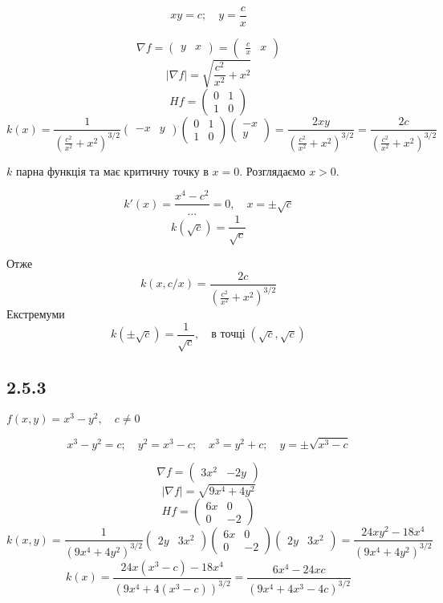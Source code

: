 \documentclass[10pt, a4paper]{article} %
\begin{document}
\[xy=c; \quad y=\frac{c}{x}\]

\[\nabla f = \begin{pmatrix} y & x\end{pmatrix} = \begin{pmatrix} \frac{c}{x} & x\end{pmatrix}\]
\[|\nabla f| = \sqrt{\frac{c^2}{x^2} + x^2}\]
\[Hf = \begin{pmatrix}
    0 & 1 \\ 1 & 0
\end{pmatrix}\]
\[k(x) = \frac{1}{\left(\frac{c^2}{x^2} + x^2\right)^{3/2}} \begin{pmatrix} -x & y\end{pmatrix} \begin{pmatrix}
    0 & 1 \\ 1 & 0
\end{pmatrix} \begin{pmatrix} -x \\ y\end{pmatrix} = \frac{2xy}{\left(\frac{c^2}{x^2} + x^2\right)^{3/2}} = \frac{2c}{\left(\frac{c^2}{x^2} + x^2\right)^{3/2}}\]

$k$ парна функція та має критичну точку в $x=0$. Розглядаємо $x>0$. 

\[k'(x) = \frac{x^4-c^2}{...} = 0, \quad x=\pm \sqrt{c}\]
\[k(\sqrt{c}) = \frac{1}{\sqrt{c}}\]

Отже
\[k(x, c/x) = \frac{2c}{\left(\frac{c^2}{x^2} + x^2\right)^{3/2}}\]
Екстремуми
\[k(\pm\sqrt{c}) = \frac{1}{\sqrt{c}}, \quad \text{в точці} \; (\sqrt{c}, \sqrt{c})\] 


\subsection*{2.5.3}
\begin{mdframed}
    $f(x,y) = x^3 - y^2, \quad c \ne 0$
\end{mdframed}

\[ x^3 - y^2=c; \quad y^2 = x^3-c; \quad x^3 = y^2+c; \quad y=\pm\sqrt{x^3-c}\]

\[\nabla f = \begin{pmatrix} 3x^2 & -2y\end{pmatrix}\]
\[|\nabla f| = \sqrt{9x^4+4y^2}\]
\[Hf = \begin{pmatrix}
    6x & 0 \\ 0 & -2
\end{pmatrix}\]
\[k(x,y) = \frac{1}{(9x^4+4y^2)^{3/2}} \begin{pmatrix} 2y & 3x^2\end{pmatrix} \begin{pmatrix}
    6x & 0 \\ 0 & -2
\end{pmatrix} \begin{pmatrix} 2y & 3x^2\end{pmatrix} = \frac{24xy^2 - 18x^4}{(9x^4+4y^2)^{3/2}}\]
\[k(x) = \frac{24x(x^3-c) - 18x^4}{(9x^4+4(x^3-c))^{3/2}} 
= \frac{6x^4-24xc}{(9x^4+4x^3-4c)^{3/2}}\]
\end{document}

